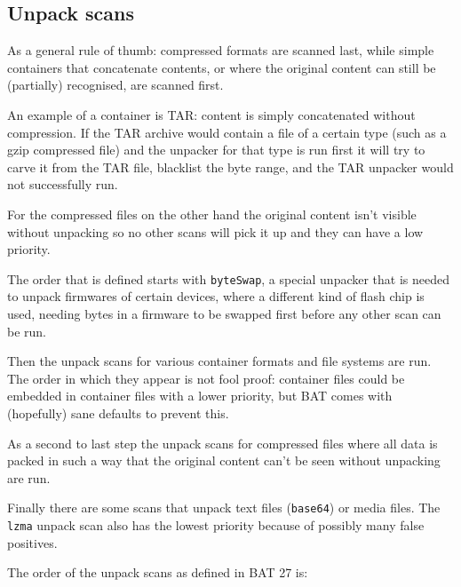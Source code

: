 \documentclass[10pt,a4paper]{article}
\begin{document}
\subsection{Unpack scans}

As a general rule of thumb: compressed formats are scanned last, while
simple containers that concatenate contents, or where the original content can
still be (partially) recognised, are scanned first.

An example of a container is TAR: content is simply concatenated without
compression. If the TAR archive would contain a file of a certain type (such as
a gzip compressed file) and the unpacker for that type is run first it will try
to carve it from the TAR file, blacklist the byte range, and the TAR unpacker
would not successfully run.

For the compressed files on the other hand the original content isn't visible
without unpacking so no other scans will pick it up and they can have a low
priority.

The order that is defined starts with \texttt{byteSwap}, a special unpacker
that is needed to unpack firmwares of certain devices, where a different kind
of flash chip is used, needing bytes in a firmware to be swapped first before
any other scan can be run.

Then the unpack scans for various container formats and file systems are run.
The order in which they appear is not fool proof: container files could be
embedded in container files with a lower priority, but BAT comes with
(hopefully) sane defaults to prevent this.

As a second to last step the unpack scans for compressed files where all data is
packed in such a way that the original content can't be seen without unpacking
are run.

Finally there are some scans that unpack text files (\texttt{base64}) or media
files. The \texttt{lzma} unpack scan also has the lowest priority because of
possibly many false positives.

The order of the unpack scans as defined in BAT 27 is:
\end{document}
